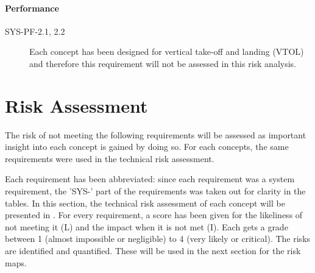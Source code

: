 \paragraph{Performance}

\begin{description}
    \item[SYS-PF-2.1, 2.2] Each concept has been designed for vertical take-off and landing (VTOL) and therefore this requirement will not be assessed in this risk analysis.
\end{description}
    




\section{Risk Assessment}
\label{sec:risk_asse}

The risk of not meeting the following requirements will be assessed as important insight into each concept is gained by doing so. For each concepts, the same requirements were used in the technical risk assessment.

Each requirement has been abbreviated: since each requirement was a system requirement, the 'SYS-' part of the requirements was taken out for clarity in the tables. In this section, the technical risk assessment of each concept will be presented in . For every requirement, a score has been given for the likeliness of not meeting it (L) and the impact when it is not met (I). Each gets a grade between 1 (almost impossible or negligible) to 4 (very likely or critical). The risks are identified and quantified. These will be used in the next section for the risk maps.



